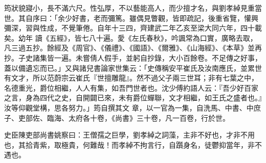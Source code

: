 \begin{pinyinscope}
 筠狀貌寢小，長不滿六尺。性弘厚，不以藝能高人，而少擅才名，與劉孝綽見重當世。其自序曰：「余少好書，老而彌篤。雖偶見瞥觀，皆即疏記，後重省覽，懽興彌深，習與性成，不覺筆倦。自年十三四，齊建武二年乙亥至梁大同六年，四十載矣。幼年
 讀《五經》，皆七八十遍。愛《左氏春秋》，吟諷常為口實，廣略去取，凡三過五抄。餘經及《周官》、《儀禮》、《國語》、《爾雅》、《山海經》、《本草》並再抄。子史諸集皆一遍。未嘗倩人假手，並躬自抄錄，大小百餘卷。不足傳之好事，蓋以備遺忘而已。」又與諸兒書論家世集云：「史傳稱安平崔氏及汝南應氏，並累世有文才，所以范蔚宗云崔氏『世擅雕龍』。然不過父子兩三世耳；非有七葉之中，名德重光，爵位相繼，人人有集，如吾門世者也。沈少傅約語人云：『吾少好百家之言，身為四代之史，自開闢已來，未有爵位蟬聯，文才相繼，如王氏之盛者也。』汝等仰觀堂構，思各努力。」筠自撰其文
 章，以一官為一集，自洗馬、中書、中庶子、吏部佐、臨海、太府各十卷，《尚書》三十卷，凡一百卷，行於世。



 史臣陳吏部尚書姚察曰：王僧孺之巨學，劉孝綽之詞藻，主非不好也，才非不用也，其拾青紫，取極貴，何難哉！而孝綽不拘言行，自躓身名，徒鬱抑當年，非不遇也。



\end{pinyinscope}